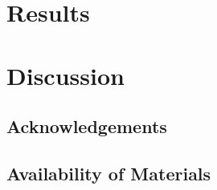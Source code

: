 \documentclass[a4paper, natbib, doc, 12pt]{apa7}
\begin{document}
\section{Results}
\section{Discussion}

\subsection*{Acknowledgements}
\subsection*{Availability of Materials}
\newpage

\end{document}
